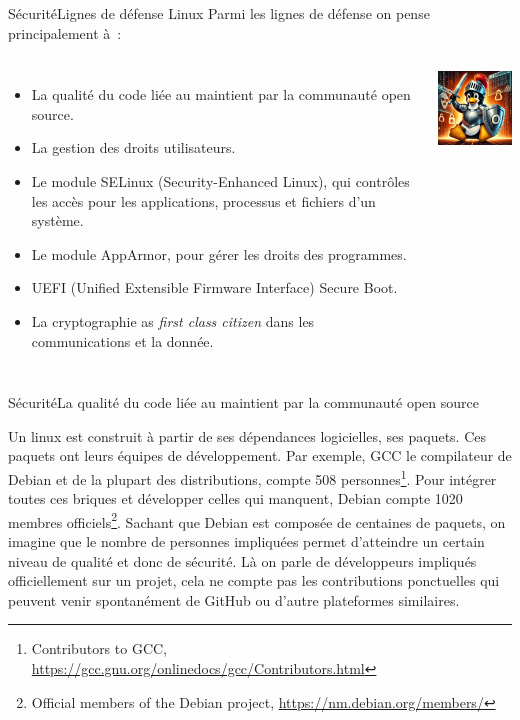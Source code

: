 \documentclass{beamer}
\begin{document}
    \begin{frame}{Sécurité}{Lignes de défense Linux}
        Parmi les lignes de défense on pense principalement à~:
        \begin{columns}
            \begin{itemize}
                \item La qualité du code liée au maintient par la communauté open source.
                \item La gestion des droits utilisateurs.
                \item Le module SELinux (Security-Enhanced Linux), qui contrôles les accès pour les applications, processus et fichiers d'un système.
                \item Le module AppArmor, pour gérer les droits des programmes.
                \item UEFI (Unified Extensible Firmware Interface) Secure Boot.
                \item La cryptographie as \textit{first class citizen} dans les communications et la donnée.
            \end{itemize}
            \centering
            \includegraphics[width=4cm]{image/tux-fighting-attack}
        \end{columns}
    \end{frame}

    \begin{frame}{Sécurité}{La qualité du code liée au maintient par la communauté open source}
        \begin{footnotesize}
            Un linux est construit à partir de ses dépendances logicielles, ses paquets.
            \bigbreak
            Ces paquets ont leurs équipes de développement.
            Par exemple, GCC le compilateur de Debian et de la plupart des distributions, compte 508 personnes\footnote{Contributors to GCC, \url{https://gcc.gnu.org/onlinedocs/gcc/Contributors.html}}.
            \bigbreak
            Pour intégrer toutes ces briques et développer celles qui manquent, Debian compte 1020 membres officiels\footnote{Official members of the Debian project, \url{https://nm.debian.org/members/}}.
            \bigbreak
            Sachant que Debian est composée de centaines de paquets, on imagine que le nombre de personnes impliquées permet d'atteindre un certain niveau de qualité et donc de sécurité.
            \bigbreak
            Là on parle de développeurs impliqués officiellement sur un projet, cela ne compte pas les contributions ponctuelles qui peuvent venir spontanément de GitHub ou d'autre plateformes similaires.
        \end{footnotesize}
    \end{frame}
\end{document}
